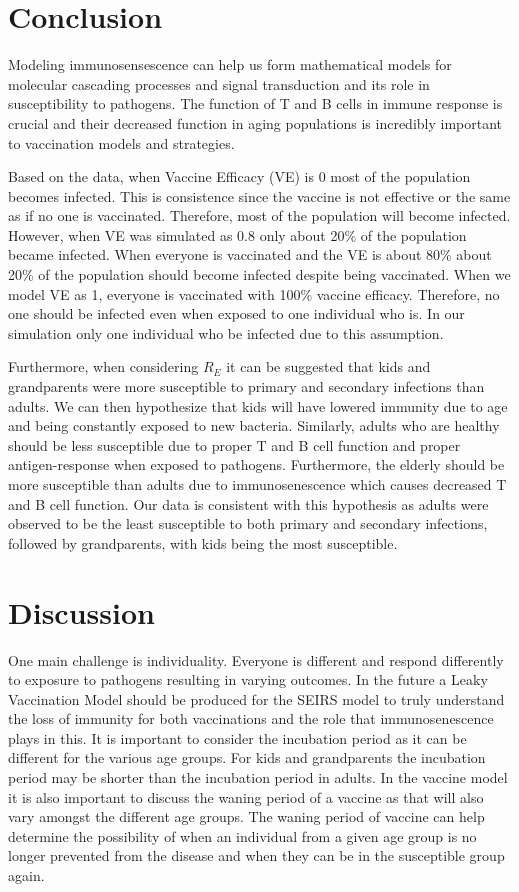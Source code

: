 \documentclass{report}
\begin{document}
\section*{Conclusion}
Modeling immunosensescence can help us form mathematical models for molecular cascading processes and signal transduction and its role in susceptibility to pathogens. The function of T and B cells in immune response is crucial and their decreased function in aging populations is incredibly important to vaccination models and strategies.

Based on the data, when Vaccine Efficacy (VE) is 0 most of the population becomes infected. This is consistence since the vaccine is not effective or the same as if no one is vaccinated. Therefore, most of the population will become infected. However, when VE was simulated as 0.8 only about 20\% of the population became infected. When everyone is vaccinated and the VE is about 80\% about 20\% of the population should become infected despite being vaccinated. When we model VE as 1, everyone is vaccinated with 100\% vaccine efficacy. Therefore, no one should be infected even when exposed to one individual who is. In our simulation only one individual who be infected due to this assumption.

Furthermore, when considering $R_E$ it can be suggested that kids and grandparents were more susceptible to primary and secondary infections than adults. We can then hypothesize that kids will have lowered immunity due to age and being constantly exposed to new bacteria. Similarly, adults who are healthy should be less susceptible due to proper T and B cell function and proper antigen-response when exposed to pathogens. Furthermore, the elderly should be more susceptible than adults due to immunosenescence which causes decreased T and B cell function. Our data is consistent with this hypothesis as adults were observed to be the least susceptible to both primary and secondary infections, followed by grandparents, with kids being the most susceptible.

\section*{Discussion}
One main challenge is individuality. Everyone is different and respond differently to exposure to pathogens resulting in varying outcomes. In the future a Leaky Vaccination Model should be produced for the SEIRS model to truly understand the loss of immunity for both vaccinations and the role that immunosenescence plays in this. It is important to consider the incubation period as it can be different for the various age groups. For kids and grandparents the incubation period may be shorter than the incubation period in adults. In the vaccine model it is also important to discuss the waning period of a vaccine as that will also vary amongst the different age groups. The waning period of vaccine can help determine the possibility of when an individual from a given age group is no longer prevented from the disease and when they can be in the susceptible group again. 
\end{document}
